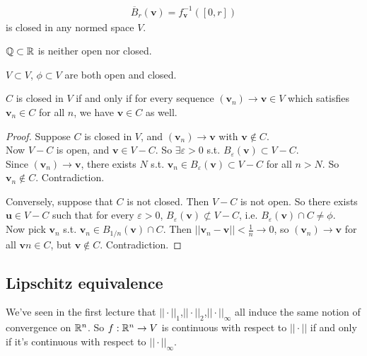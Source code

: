 \documentclass[a4paper]{article}
\begin{document}
\begin{eg}
\begin{equation*}
\begin{aligned}
\overline{B}_r\left(\mathbf{v}\right) = f_\mathbf{v}^{-1} \left(\left[0,r\right]\right)
\end{aligned}
\end{equation*}
is closed in any normed space $V$.
\end{eg}

\begin{eg}
$\mathbb{Q} \subset \mathbb{R}$ is neither open nor closed.
\end{eg}

\begin{eg}
$V \subset V$, $\phi \subset V$ are both open and closed.
\end{eg}

\begin{prop}
$C$ is closed in $V$ if and only if for every sequence $\left(\mathbf{v}_n\right) \to \mathbf{v} \in V$ which satisfies $\mathbf{v}_n \in C$ for all $n$, we have $\mathbf{v} \in C$ as well.
\begin{proof}
Suppose $C$ is closed in $V$, and $\left(\mathbf{v}_n\right) \to \mathbf{v}$ with $\mathbf{v} \not \in C$.\\
Now $V-C$ is open, and $\mathbf{v} \in V-C$. So $\exists \varepsilon > 0$ s.t. $B_\varepsilon\left(\mathbf{v}\right) \subset V-C$.\\
Since $\left(\mathbf{v}_n\right) \to \mathbf{v}$, there exists $N$ s.t. $\mathbf{v}_n \in B_\varepsilon\left(\mathbf{v}\right) \subset V-C$ for all $n>N$. So $\mathbf{v}_n \not \in C$. Contradiction.

Conversely, suppose that $C$ is not closed. Then $V-C$ is not open. So there exists $\mathbf{u} \in V-C$ such that for every $\varepsilon > 0$, $B_\varepsilon\left(\mathbf{v}\right) \not \subset V-C$, i.e. $B_\varepsilon\left(\mathbf{v}\right) \cap C \neq \phi$.\\
Now pick $\mathbf{v}_n$ s.t. $\mathbf{v}_n \in B_{1/n}\left(\mathbf{v}\right) \cap C$. Then $||\mathbf{v}_n-\mathbf{v}|| < \frac{1}{n} \to 0$, so $\left(\mathbf{v}_n\right) \to \mathbf{v}$ for all $\mathbf{v}n \in C$, but $\mathbf{v} \not \in C$. Contradiction.
\end{proof}
\end{prop}

\subsection{Lipschitz equivalence}
We've seen in the first lecture that $||\cdot||_1$,$||\cdot||_2$,$||\cdot||_\infty$ all induce the same notion of convergence on $\mathbb{R}^n$. So $f:\mathbb{R}^n \to V$ is continuous with respect to $||\cdot||$ if and only if  it's continuous with respect to $||\cdot||_\infty$.
\end{document}
